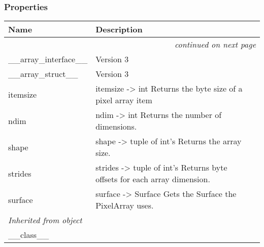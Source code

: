 
  \subsubsection{Properties}

    \vspace{-1cm}
\hspace{\varindent}\begin{longtable}{|p{\varnamewidth}|p{\vardescrwidth}|l}
\cline{1-2}
\cline{1-2} \centering \textbf{Name} & \centering \textbf{Description}& \\
\cline{1-2}
\endhead\cline{1-2}\multicolumn{3}{r}{\small\textit{continued on next page}}\\\endfoot\cline{1-2}
\endlastfoot\raggedright \_\-\_\-a\-r\-r\-a\-y\-\_\-i\-n\-t\-e\-r\-f\-a\-c\-e\-\_\-\_\- & \raggedright Version 3&\\
\cline{1-2}
\raggedright \_\-\_\-a\-r\-r\-a\-y\-\_\-s\-t\-r\-u\-c\-t\-\_\-\_\- & \raggedright Version 3&\\
\cline{1-2}
\raggedright i\-t\-e\-m\-s\-i\-z\-e\- & \raggedright itemsize -{\textgreater} int Returns the byte size of a pixel 
          array item&\\
\cline{1-2}
\raggedright n\-d\-i\-m\- & \raggedright ndim -{\textgreater} int Returns the number of dimensions.&\\
\cline{1-2}
\raggedright s\-h\-a\-p\-e\- & \raggedright shape -{\textgreater} tuple of int's Returns the array size.&\\
\cline{1-2}
\raggedright s\-t\-r\-i\-d\-e\-s\- & \raggedright strides -{\textgreater} tuple of int's Returns byte offsets for 
          each array dimension.&\\
\cline{1-2}
\raggedright s\-u\-r\-f\-a\-c\-e\- & \raggedright surface -{\textgreater} Surface Gets the Surface the PixelArray 
          uses.&\\
\cline{1-2}
\multicolumn{2}{|l|}{\textit{Inherited from object}}\\
\multicolumn{2}{|p{\varwidth}|}{\raggedright \_\_class\_\_}\\
\cline{1-2}
\end{longtable}



